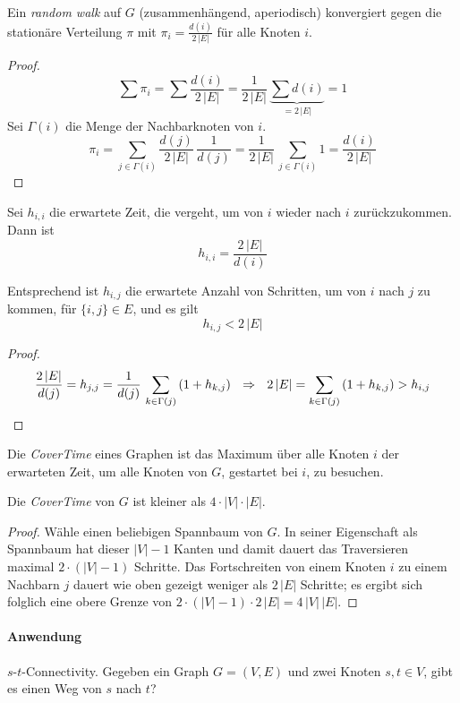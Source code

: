 \begin{satz}
	Ein \emph{random walk} auf $G$ (zusammenhängend, aperiodisch)
	konvergiert gegen die stationäre Verteilung $\pi$ mit $\pi_i =
	\frac{d(i)}{2\,|E|}$ für alle Knoten $i$.
\end{satz}
\begin{proof}
	\[ \sum \pi_i = \sum \frac{d(i)}{2\,|E|} =
	\frac{1}{2\,|E|}\,\underbrace{\sum d(i)}_{=2\,|E|} = 1 \]
	Sei $\Gamma(i)$ die Menge der Nachbarknoten von $i$.
	\[ \pi_i = \sum_{j\in\Gamma(i)} \frac{d(j)}{2\,|E|}\,\frac{1}{d(j)} =
	\frac{1}{2\,|E|}\,\sum_{j\in\Gamma(i)} 1 = \frac{d(i)}{2\,|E|} \]
\end{proof}
\begin{korr}
	Sei $h_{i,i}$ die erwartete Zeit, die vergeht, um von $i$ wieder nach
	$i$ zurückzukommen. Dann ist
	\[
	  h_{i,i} = \frac{2\,|E|}{d(i)}
	\]
\end{korr}
\begin{lemm}
	Entsprechend ist $h_{i,j}$ die erwartete Anzahl von Schritten, um von
	$i$ nach $j$ zu kommen, für $\{i,j\} \in E$, und es gilt
	\[
	  h_{i,j} < 2\,|E|
	\]
\end{lemm}
\begin{proof}
	\[
	  \frac{2\,|E|}{d(j)} = h_{j,j} =
	  \frac{1}{d(j)}\,\sum_{k\in\Gamma(j)}\left(1+h_{k,j}\right)
	  \ \ \Rightarrow\ \ 2\,|E| = \sum_{k\in\Gamma(j)} \left(1+ h_{k,j}\right) >
	  h_{i,j} \qedhere
	\]
\end{proof}
\begin{defn}
	Die \emph{CoverTime} eines Graphen ist das Maximum über alle Knoten $i$
	der erwarteten Zeit, um alle Knoten von $G$, gestartet bei $i$, zu
	besuchen.
\end{defn}
\begin{satz}
	Die \emph{CoverTime} von $G$ ist kleiner als $4\cdot|V|\cdot|E|$.
\end{satz}
\begin{proof}
	Wähle einen beliebigen Spannbaum von $G$. In seiner Eigenschaft als
	Spannbaum hat dieser $|V|-1$ Kanten und damit dauert das Traversieren
	maximal $2\cdot\left(|V|-1\right)$ Schritte. Das Fortschreiten von
	einem Knoten $i$ zu einem Nachbarn $j$ dauert wie oben gezeigt weniger
	als $2\,|E|$ Schritte; es ergibt sich folglich eine obere Grenze von
	$2\cdot\left(|V|-1\right)\cdot2\,|E| = 4\,|V|\,|E|$.
\end{proof}
\paragraph{Anwendung} $s$-$t$-Connectivity. Gegeben ein Graph $G = (V,E)$ und
zwei Knoten $s, t \in V$, gibt es einen Weg von $s$ nach $t$?

